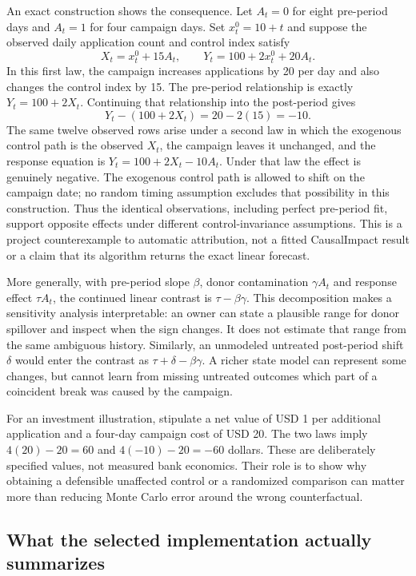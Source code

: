 An exact construction shows the consequence. Let \(A_t=0\) for eight
pre-period days and \(A_t=1\) for four campaign days. Set
\(x_t^0=10+t\) and suppose the observed daily application count and control
index satisfy
\[
 X_t=x_t^0+15A_t,\qquad
 Y_t=100+2x_t^0+20A_t.
\]
In this first law, the campaign increases applications by 20 per day and
also changes the control index by 15. The pre-period relationship is exactly
\(Y_t=100+2X_t\). Continuing that relationship into the post-period gives
\[
 Y_t-(100+2X_t)=20-2(15)=-10.
\]
The same twelve observed rows arise under a second law in which the
exogenous control path is the observed \(X_t\), the campaign leaves it
unchanged, and the response equation is
\(Y_t=100+2X_t-10A_t\). Under that law the effect is genuinely negative.
The exogenous control path is allowed to shift on the campaign date; no
random timing assumption excludes that possibility in this construction.
Thus the identical observations, including perfect pre-period fit, support
opposite effects under different control-invariance assumptions. This is a
project counterexample to automatic attribution, not a fitted CausalImpact
result or a claim that its algorithm returns the exact linear forecast.
\cite{exec13_cimpact_examples}

More generally, with pre-period slope \(\beta\), donor contamination
\(\gamma A_t\) and response effect \(\tau A_t\), the continued linear
contrast is \(\tau-\beta\gamma\). This decomposition makes a sensitivity
analysis interpretable: an owner can state a plausible range for donor
spillover and inspect when the sign changes. It does not estimate that range
from the same ambiguous history. Similarly, an unmodeled untreated
post-period shift \(\delta\) would enter the contrast as
\(\tau+\delta-\beta\gamma\). A richer state model can represent some
changes, but cannot learn from missing untreated outcomes which part of a
coincident break was caused by the campaign.

For an investment illustration, stipulate a net value of USD 1 per additional
application and a four-day campaign cost of USD 20. The two laws imply
\(4(20)-20=60\) and \(4(-10)-20=-60\) dollars. These are deliberately
specified values, not measured bank economics. Their role is to show why
obtaining a defensible unaffected control or a randomized comparison can
matter more than reducing Monte Carlo error around the wrong counterfactual.
\cite{exec13_cimpact_examples}

\subsection{What the selected implementation actually summarizes}

